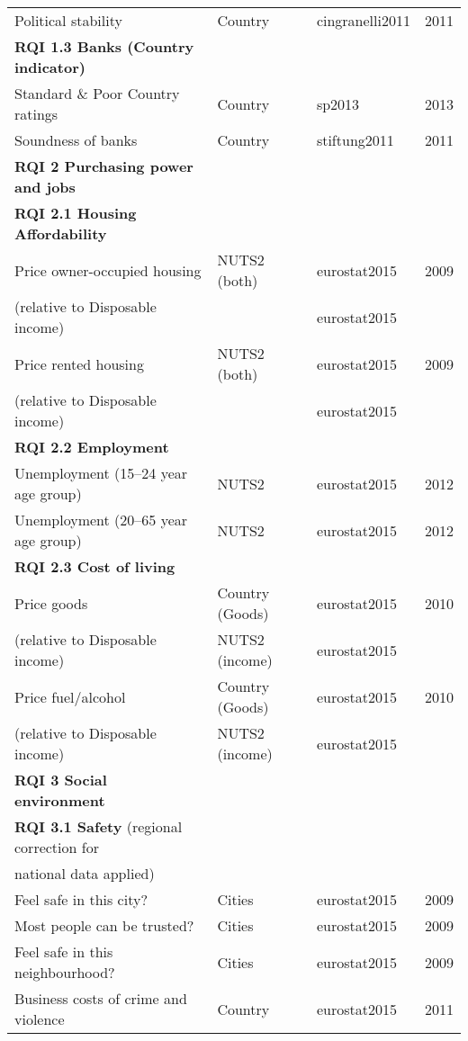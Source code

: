 \documentclass[a4paper,twoside]{article}
\begin{document}
{\begin{longtable}{llll}
    Political stability & Country & cingranelli2011 & 2011 \\[3mm]
    {\bf RQI 1.3 Banks (Country indicator)} &       &       &  \\
    Standard \& Poor Country ratings & Country & sp2013   & 2013 \\
    Soundness of banks & Country & stiftung2011 & 2011 \\[3mm]
    {\bf RQI 2  Purchasing power and jobs} &       &       &  \\
    {\bf RQI 2.1 Housing Affordability} &       &       &  \\
    Price owner-occupied housing & NUTS2 (both) & eurostat2015 & 2009 \\
    (relative to Disposable income) & & eurostat2015 &  \\
    Price rented housing & NUTS2 (both) & eurostat2015 & 2009 \\
    (relative to Disposable income) &       & eurostat2015 &  \\[3mm]
    {\bf RQI 2.2 Employment} &       &       &  \\
    Unemployment (15–24 year age group) & NUTS2 & eurostat2015 & 2012 \\
    Unemployment (20–65 year age group) & NUTS2 & eurostat2015 & 2012 \\[3mm]
    {\bf RQI 2.3 Cost of living} &       &       &  \\
    Price goods & Country (Goods) & eurostat2015 & 2010 \\
    (relative to Disposable income) & NUTS2 (income) & eurostat2015 &  \\
    Price fuel/alcohol & Country (Goods) & eurostat2015 & 2010 \\
    (relative to Disposable income) & NUTS2 (income) &  eurostat2015 &  \\[3mm]
    {\bf RQI 3 Social environment} &       &       &  \\
    {\bf RQI 3.1 Safety} (regional correction for &       &       &  \\
    national data applied) &       &       &  \\
    Feel safe in this city? & Cities & eurostat2015 & 2009 \\
    Most people can be trusted? & Cities & eurostat2015 & 2009 \\
    Feel safe in this neighbourhood? & Cities & eurostat2015 & 2009 \\
    Business costs of crime and violence & Country & eurostat2015 & 2011 \\

\end{longtable}}
\end{document}
